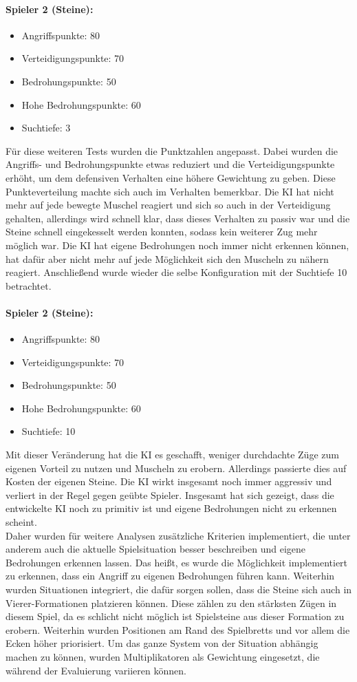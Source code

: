 \paragraph{Spieler 2 (Steine):}
\begin{itemize}
	\item Angriffspunkte: 80
	\item Verteidigungspunkte: 70
	\item Bedrohungspunkte: 50
	\item Hohe Bedrohungspunkte: 60
	\item Suchtiefe: 3
\end{itemize}
Für diese weiteren Tests wurden die Punktzahlen angepasst. Dabei wurden die Angriffs- und Bedrohungspunkte etwas reduziert und die Verteidigungspunkte erhöht, um dem defensiven Verhalten eine höhere Gewichtung zu geben. Diese Punkteverteilung machte sich auch im Verhalten bemerkbar. Die KI hat nicht mehr auf jede bewegte Muschel reagiert und sich so auch in der Verteidigung gehalten, allerdings wird schnell klar, dass dieses Verhalten zu passiv war und die Steine schnell eingekesselt werden konnten, sodass kein weiterer Zug mehr möglich war. Die KI hat eigene Bedrohungen noch immer nicht erkennen können, hat dafür aber nicht mehr auf jede Möglichkeit sich den Muscheln zu nähern reagiert. Anschließend wurde wieder die selbe Konfiguration mit der Suchtiefe 10 betrachtet.

\paragraph{Spieler 2 (Steine):}
\begin{itemize}
	\item Angriffspunkte: 80
	\item Verteidigungspunkte: 70
	\item Bedrohungspunkte: 50
	\item Hohe Bedrohungspunkte: 60
	\item Suchtiefe: 10
\end{itemize}
Mit dieser Veränderung hat die KI es geschafft, weniger durchdachte Züge zum eigenen Vorteil zu nutzen und Muscheln zu erobern. Allerdings passierte dies auf Kosten der eigenen Steine. Die KI wirkt insgesamt noch immer aggressiv und verliert in der Regel gegen geübte Spieler. Insgesamt hat sich gezeigt, dass die entwickelte KI noch zu primitiv ist und eigene Bedrohungen nicht zu erkennen scheint.\\
Daher wurden für weitere Analysen zusätzliche Kriterien implementiert, die unter anderem auch die aktuelle Spielsituation besser beschreiben und eigene Bedrohungen erkennen lassen. Das heißt, es wurde die Möglichkeit implementiert zu erkennen, dass ein Angriff zu eigenen Bedrohungen führen kann. Weiterhin wurden Situationen integriert, die dafür sorgen sollen, dass die Steine sich auch in Vierer-Formationen platzieren können. Diese zählen zu den stärksten Zügen in diesem Spiel, da es schlicht nicht möglich ist Spielsteine aus dieser Formation zu erobern. Weiterhin wurden Positionen am Rand des Spielbretts und vor allem die Ecken höher priorisiert. Um das ganze System von der Situation abhängig machen zu können, wurden Multiplikatoren als Gewichtung eingesetzt, die während der Evaluierung variieren können.
